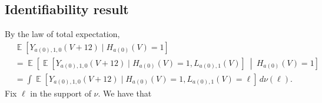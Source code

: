 \documentclass[12pt]{article}
\theoremstyle{definition}
\DeclareMathOperator{\cE}{\mathbb{E}}
\newcommand{\Hopen}{V}
\begin{document}
\subsection{Identifiability result}
By the law of total expectation, %
\begin{align}
    &\cE[Y_{a(0),1,0}(\Hopen+12)\mid H_{a(0)}(\Hopen)=1] \nonumber \\
    &= \cE\left[\cE[Y_{a(0),1,0}(\Hopen+12)\mid H_{a(0)}(\Hopen)=1,L_{a(0),1}(\Hopen)]\ \middle|\  H_{a(0)}(\Hopen)=1\right] \nonumber \\
    &= \int \cE[Y_{a(0),1,0}(\Hopen+12)\mid H_{a(0)}(\Hopen)=1,L_{a(0),1}(\Hopen)=\ell]\, d\nu(\ell). %
    \label{eq:psia0} 
\label{eq:psia0} 
\end{align}
Fix $\ell$ in the support of $\nu$. We have that
\end{document}
